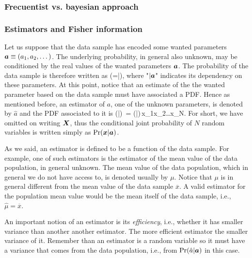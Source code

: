 \subsubsection{Frecuentist vs. bayesian approach}

\subsubsection{Estimators and Fisher information}

Let us suppose that the data sample has encoded some wanted parameters $\boldsymbol{a}\equiv(a_1,a_2,\dots)$.
The underlying probability, in general also unknown, may be conditioned by the real values of the wanted parameters $\boldsymbol{a}$.
The probability of the data sample is therefore written as
\be
  \prob(=|),
\ee
where "$|\boldsymbol{a}$" indicates its dependency on these parameters.
At this point, notice that an estimate of the the wanted parameter based on the data sample must have associated a PDF.
Hence as mentioned before, an estimator of $a$, one of the unknown parameters, is denoted by $\hat{a}$ and the PDF associated to it is
\be
  \prob(|)\, = \prob(|)\,x_1x_2\dots{}x_N.
\ee
For short, we have omitted on writing $\boldsymbol{X}$, thus the conditional joint probability of $N$ random variables is written simply as $\text{Pr}(\boldsymbol{x}|\boldsymbol{a})$.

As we said, an estimator is defined to be a function of the data sample.
For example, one of such estimators is the estimator of the mean value of the data population, in general unknown.
The mean value of the data population, which in general we do not have access to, is denoted usually by $\mu$.
Notice that $\mu$ is in general different from the mean value of the data sample $\overline{x}$.
A valid estimator for the population mean value would be the mean itself of the data sample, i.e., $\hat{\mu}=\overline{x}$.

An important notion of an estimator is its \emph{efficiency}, i.e., whether it has smaller variance than another another estimator.
The more efficient estimator the smaller variance of it.
Remember than an estimator is a random variable so it must have a variance that comes from the data population, i.e., from $\text{Pr}(\hat{a}|\boldsymbol{a})$ in this case.

